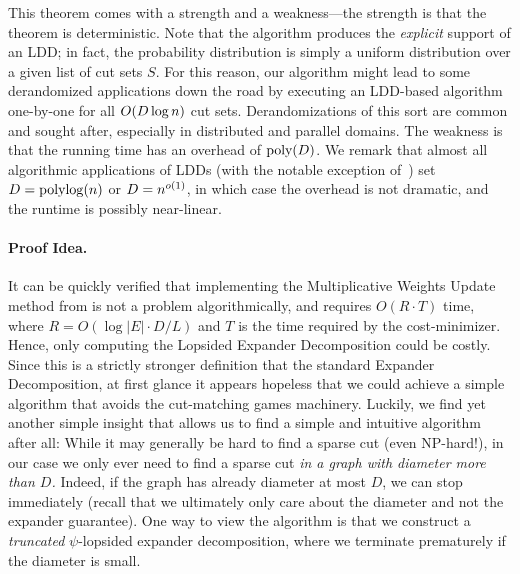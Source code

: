 \documentclass[letterpaper,11pt]{article}
\begin{document}
This theorem comes with a strength and a weakness---the strength is that the theorem is deterministic. Note that the algorithm produces the \emph{explicit} support of an LDD; in fact, the probability distribution is simply a uniform distribution over a given list of cut sets $S$. For this reason, our algorithm might lead to some derandomized applications down the road by executing an LDD-based algorithm one-by-one for all $O(D \log n)$ cut sets. Derandomizations of this sort are common and sought after, especially in distributed and parallel domains. The weakness is that the running time has an overhead of $\operatorname{\text{{\rm poly}}}(D)$. We remark that almost all algorithmic applications of LDDs (with the notable exception of~\cite{BernsteinNW22}) set $D = \operatorname{polylog}(n)$ or $D = n^{o(1)}$, in which case the overhead is not dramatic, and the runtime is possibly near-linear.

\paragraph{Proof Idea.}
It can be quickly verified that implementing the Multiplicative Weights Update method from  is not a problem algorithmically, and requires $O(R \cdot T)$ time, where $R=O(\log |E| \cdot D/L)$ and $T$ is the time required by the cost-minimizer. Hence, only computing the Lopsided Expander Decomposition could be costly. Since this is a strictly stronger definition that the standard Expander Decomposition, at first glance it appears hopeless that we could achieve a simple algorithm that avoids the cut-matching games machinery. Luckily, we find yet another simple insight that allows us to find a simple and intuitive algorithm after all: While it may generally be hard to find a sparse cut (even NP-hard!), in our case we only ever need to find a sparse cut \emph{in a graph with diameter more than $D$.} Indeed, if the graph has already diameter at most $D$, we can stop immediately (recall that we ultimately only care about the diameter and not the expander guarantee). One way to view the algorithm is that we construct a \emph{truncated} $\psi$-lopsided expander decomposition, where we terminate prematurely if the diameter is small.
\end{document}
